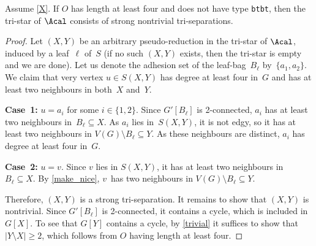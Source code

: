 \documentclass{aic}
\newcommand{\se}{\subseteq}
\theoremstyle{plain}
\theoremstyle{definition}
\theoremstyle{plain}
\theoremstyle{plain}
\newcommand{\sm}{\setminus}
\renewcommand{\ge}{\geqslant}
\newcommand{\ty}[1]{{\tt#1}}
\begin{document}
\begin{lem}\label{is_nontrivial}
Assume \autoref{X}.
If $O$ has length at least four and does not have type \ty{btbt}, then the tri-star of $\Acal$ consists of strong nontrivial tri-separations.
\end{lem}
\begin{proof}
Let $(X,Y)$ be an arbitrary pseudo-reduction in the tri-star of $\Acal$, induced by a leaf~$\ell$ of~$S$ (if no such $(X,Y)$ exists, then the tri-star is empty and we are done).
Let us denote the adhesion set of the leaf-bag~$B_\ell$ by~$\{a_1,a_2\}$.
We claim that very vertex $u\in S(X,Y)$ has degree at least four in~$G$ and has at least two neighbours in both~$X$ and~$Y$.

\textbf{Case~1:} $u=a_i$ for some $i\in\{1,2\}$.
Since $G'[B_\ell]$ is 2-connected, $a_i$ has at least two neighbours in~$B_\ell\se X$.
As $a_i$ lies in~$S(X,Y)$, it is not edgy, so it has at least two neighbours in $V(G)\sm B_\ell\se Y$.
As these neighbours are distinct, $a_i$ has degree at least four in~$G$.

\textbf{Case~2:} $u=v$.
Since $v$ lies in $S(X,Y)$, it has at least two neighbours in~$B_\ell\se X$.
By \autoref{make_nice}, $v$~has two neighbours in $V(G)\sm B_\ell\se Y$.

Therefore, $(X,Y)$ is a strong tri-separation.
It remains to show that $(X,Y)$ is nontrivial. 
Since $G'[B_\ell]$ is 2-connected, it contains a cycle, which is included in~$G[X]$.
To see that $G[Y]$ contains a cycle, by \autoref{trivial} it suffices to show that $|Y\sm X|\ge 2$, 
which follows from $O$ having length at least four. 
\end{proof}
\end{document}
